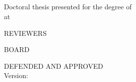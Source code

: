\begin{titlepage}
    \begin{addmargin}[-1cm]{-3cm}
        \begin{center}
            \large

            \hfill

            \vfill
            \spacedlowsmallcaps{\myAuthor} \\ \bigskip
            \begingroup
                \color{Maroon}\spacedallcaps{\myTitle} \\ \bigskip
            \endgroup
            \vfill
            \mySubtitle{} \\ \bigskip

            \vfill

            \def\svgwidth{.5\textwidth}
             \\ \medskip


            \vfill{}
        \end{center}

        \noindent
        Doctoral thesis presented for the degree of\\
        \myDegree{} at

        \medskip{}

        \noindent
        \myInstitute{}\bigskip

        \vfill

        \noindent
        REVIEWERS\\
        \myReviewers{}\bigskip

        \noindent
        BOARD\\
        \myBoard{}\bigskip

        \noindent
	    \ifdefined \myDefense
	    DEFENDED AND APPROVED\\\myDefense
	    \else
	    Version: \myVersion
	    \fi

    \end{addmargin}
\end{titlepage}
